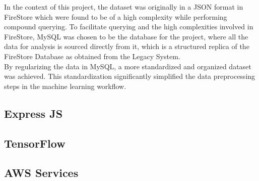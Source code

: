 In the context of this project, the dataset was originally in a JSON format in FireStore which were found to be of a high complexity while performing compound querying. To facilitate querying and the high complexities involved in FireStore,
MySQL was chosen to be the database for the project, where all the data for analysis is sourced directly from it, which is a structured replica of the FireStore Database as obtained from the Legacy System.\\
By regularizing the data in MySQL, a more standardized and organized dataset was achieved. This standardization significantly simplified the data preprocessing steps in the machine learning workflow.


\subsection{Express JS}

\subsection{TensorFlow}

\subsection{AWS Services}

